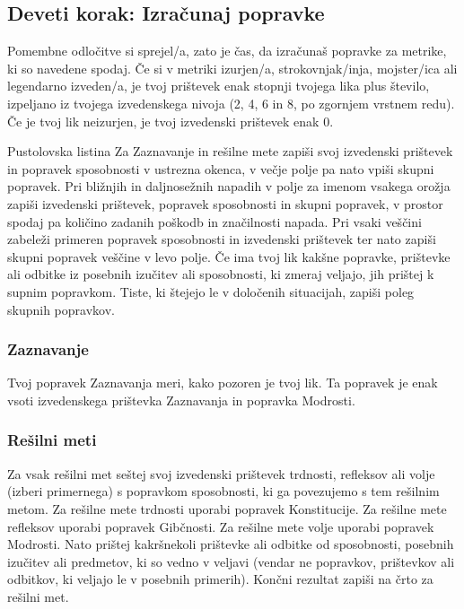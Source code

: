 \subsection{Deveti korak: Izračunaj popravke}
Pomembne odločitve si sprejel/a, zato je čas, da izračunaš popravke za metrike, ki so navedene spodaj. Če si v metriki izurjen/a, strokovnjak/inja, mojster/ica ali legendarno izveden/a, je tvoj prištevek enak stopnji tvojega lika plus število, izpeljano iz tvojega izvedenskega nivoja (2, 4, 6 in 8, po zgornjem vrstnem redu). Če je tvoj lik neizurjen, je tvoj izvedenski prištevek enak 0.

\begin{rpg-titlebox}{Pustolovska listina}
    Za Zaznavanje in rešilne mete zapiši svoj izvedenski prištevek in popravek sposobnosti v ustrezna okenca, v večje polje pa nato vpiši skupni popravek. Pri bližnjih in daljnosežnih napadih v polje za imenom vsakega orožja zapiši izvedenski prištevek, popravek sposobnosti in skupni popravek, v prostor spodaj pa količino zadanih poškodb in značilnosti napada. Pri vsaki veščini zabeleži primeren popravek sposobnosti in izvedenski prištevek ter nato zapiši skupni popravek veščine v levo polje. Če ima tvoj lik kakšne popravke, prištevke ali odbitke iz posebnih izučitev ali sposobnosti, ki zmeraj veljajo, jih prištej k supnim popravkom. Tiste, ki štejejo le v določenih situacijah, zapiši poleg skupnih popravkov.
\end{rpg-titlebox}

\subsubsection{Zaznavanje}
Tvoj popravek Zaznavanja meri, kako pozoren je tvoj lik. Ta popravek je enak vsoti izvedenskega prištevka Zaznavanja in popravka Modrosti.

\subsubsection{Rešilni meti}
Za vsak rešilni met seštej svoj izvedenski prištevek trdnosti, refleksov ali volje (izberi primernega) s popravkom sposobnosti, ki ga povezujemo s tem rešilnim metom. Za rešilne mete trdnosti uporabi popravek Konstitucije. Za rešilne mete refleksov uporabi popravek Gibčnosti. Za rešilne mete volje uporabi popravek Modrosti. Nato prištej kakršnekoli prištevke ali odbitke od sposobnosti, posebnih izučitev ali predmetov, ki so vedno v veljavi (vendar ne popravkov, prištevkov ali odbitkov, ki veljajo le v posebnih primerih). Končni rezultat zapiši na črto za rešilni met.

